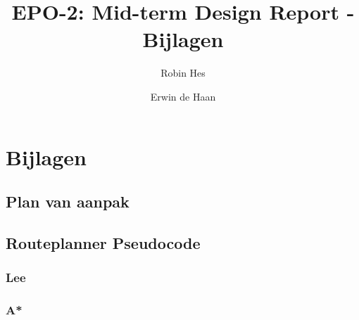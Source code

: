 \documentclass{report}
\title{EPO-2: Mid-term Design Report - Bijlagen}
\author{Robin Hes \and Erwin de Haan}
\begin{document}
\chapter{Bijlagen}
\label{ch:bijlagen}

\newpage
\section{Plan van aanpak}
\label{sec:pva}



\section{Routeplanner Pseudocode}
\label{sec:pseudocode}

\subsection{Lee}
\label{ssec:pseudocode-lee}
\cite{pseudocode-lee}

\subsection{A*}
\label{ssec:pseudocode-astar}
\cite{pseudocode-astar}

\newpage
\end{document}
